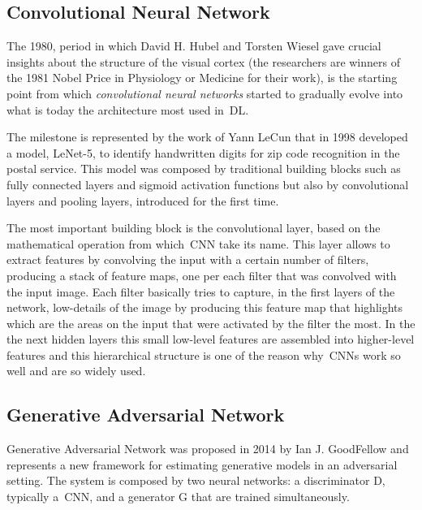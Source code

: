 \subsection{Convolutional Neural Network}
\label{sec:convolutional_neural_network}
The 1980, period in which David H. Hubel and Torsten Wiesel gave crucial insights about the structure of the visual cortex (the researchers are winners of the 1981 Nobel Price in Physiology or Medicine for their work), is the starting point from which \textit{convolutional neural networks} started to gradually evolve into what is today the architecture most used in~\ac{DL}.

\vspace{5mm} %
The milestone is represented by the work of Yann LeCun that in 1998 developed a model, LeNet-5, to identify handwritten digits for zip code recognition in the postal service\cite{lecun}.
This model was composed by traditional building blocks such as fully connected layers and sigmoid activation functions but also by convolutional layers and pooling layers, introduced for the first time.

The most important building block is the convolutional layer, based on the mathematical operation from which~\ac{CNN} take its name. This layer allows to extract features by convolving the input with a certain number of filters, producing a stack of feature maps, one per each filter that was convolved with the input image.
Each filter basically tries to capture, in the first layers of the network, low-details of the image by producing this feature map that highlights which are the areas on the input that were activated by the filter the most.
In the the next hidden layers this small low-level features are assembled into higher-level features and this hierarchical structure is one of the reason why~\ac{CNN}s work so well and are so widely used\cite{lecun}.

\subsection{Generative Adversarial Network}
\label{subsec:gan}
Generative Adversarial Network was proposed in 2014 by Ian J. GoodFellow\cite{gan} and represents a new framework for estimating generative models in an adversarial setting. The system is composed by two neural networks: a discriminator D, typically a~\ac{CNN}, and a generator G that are trained simultaneously. 

